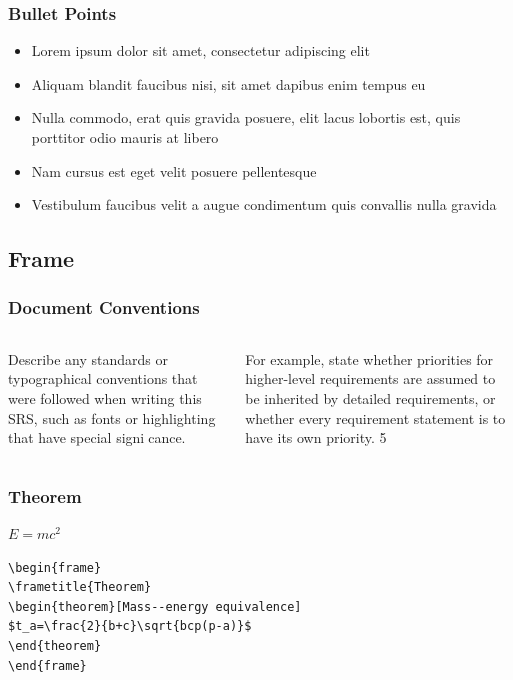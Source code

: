 \documentclass{beamer}
\begin{document}
\begin{frame}
\frametitle{Bullet Points}
\begin{itemize}
\item Lorem ipsum dolor sit amet, consectetur adipiscing elit
\item Aliquam blandit faucibus nisi, sit amet dapibus enim tempus eu
\item Nulla commodo, erat quis gravida posuere, elit lacus lobortis est, quis porttitor odio mauris at libero
\item Nam cursus est eget velit posuere pellentesque
\item Vestibulum faucibus velit a augue condimentum quis convallis nulla gravida
\end{itemize}
\end{frame}
\begin{frame}
\subsection{Frame}
\frametitle{Document Conventions}
\begin{columns}[c]
Describe any standards or
typographical conventions that
were followed when writing this
SRS, such as fonts or highlighting
that have special signicance.

For example, state whether priorities
for higher-level requirements are
assumed to be inherited by detailed
requirements, or whether every
requirement statement is to have its
own priority.
5
\end{columns}
\end{frame}

\begin{frame}[fragile]

\frametitle{Theorem}
\begin{theorem}
$E = mc^2$
\end{theorem}

\begin{example}
\begin{verbatim}
\begin{frame}
\frametitle{Theorem}
\begin{theorem}[Mass--energy equivalence]
$t_a=\frac{2}{b+c}\sqrt{bcp(p-a)}$
\end{theorem}
\end{frame}\end{verbatim}
\end{example}


\end{frame}
\end{document}
